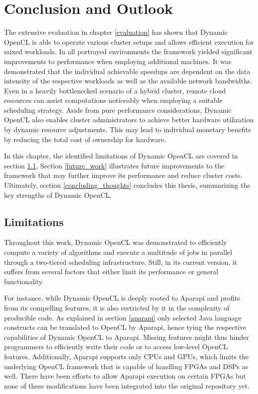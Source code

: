 \chapter{Conclusion and Outlook}
\label{conclusion}
The extensive evaluation in chapter \ref{evaluation} has shown that Dynamic OpenCL is able to operate various cluster setups and allows efficient execution for mixed workloads. In all portrayed environments the framework yielded significant improvements to performance when employing additional machines. It was demonstrated that the individual achievable speedups are dependent on the data intensity of the respective workloads as well as the available network bandwidths. Even in a heavily bottlenecked scenario of a hybrid cluster, remote cloud resources can assist computations noticeably when employing a suitable scheduling strategy. Aside from pure performance considerations, Dynamic OpenCL also enables cluster administrators to achieve better hardware utilization by dynamic resource adjustments. This may lead to individual monetary benefits by reducing the total cost of ownership for hardware.

In this chapter, the identified limitations of Dynamic OpenCL are covered in section \ref{limitations}. Section \ref{future_work} illustrates future improvements to the framework that may further improve its performance and reduce cluster costs. Ultimately, section \ref{concluding_thoughts} concludes this thesis, summarizing the key strengths of Dynamic OpenCL.

\section{Limitations}
\label{limitations}
Throughout this work, Dynamic OpenCL was demonstrated to efficiently compute a variety of algorithms and execute a multitude of jobs in parallel through a two-tiered scheduling infrastructure. Still, in its current version, it suffers from several factors that either limit its performance or general functionality.

For instance, while Dynamic OpenCL is deeply rooted to Aparapi and profits from its compelling features, it is also restricted by it in the complexity of producible code. As explained in section \ref{aparapi} only selected Java language constructs can be translated to OpenCL by Aparapi, hence tying the respective capabilities of Dynamic OpenCL to Aparapi. Missing features might thus hinder programmers to efficiently write their code or to access low-level OpenCL features. Additionally, Aparapi supports only CPUs and GPUs, which limits the underlying OpenCL framework that is capable of handling FPGAs and DSPs as well. There have been efforts to allow Aparapi execution on certain FPGAs but none of these modifications have been integrated into the original repository yet\cite{aparapi_ucores}.

